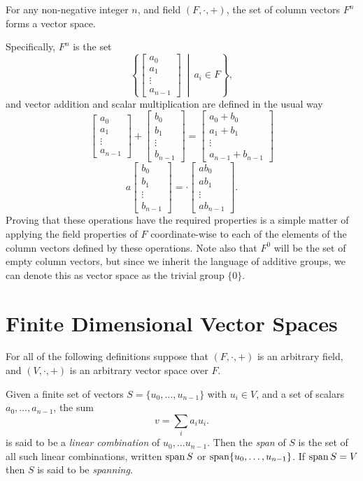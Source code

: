 \begin{prop}
For any non-negative integer $n$, and field $(F, \cdot, +)$, the set of column vectors $F^n$ forms a vector space.
\end{prop}
Specifically, $F^n$ is the set
\[\left\{\begin{bmatrix}a_0\\a_1\\\vdots\\a_{n-1}\end{bmatrix}\ \middle|\ a_i \in F\right\},\]
and vector addition and scalar multiplication are defined in the usual way
\[\begin{bmatrix}
	a_0 \\ a_1 \\ \vdots \\ a_{n-1}
\end{bmatrix} + \begin{bmatrix}
b_0 \\ b_1 \\ \vdots \\ b_{n-1}
\end{bmatrix} = \begin{bmatrix}
a_0 + b_0 \\ a_1 + b_1 \\ \vdots \\ a_{n-1} + b_{n-1}
\end{bmatrix}\]
\[
a\begin{bmatrix}
	b_0 \\ b_1 \\ \vdots \\ b_{n-1}
\end{bmatrix} = \cdot \begin{bmatrix}
	a b_0 \\ a b_1 \\ \vdots \\ a b_{n-1}
\end{bmatrix}.
\]
Proving that these operations have the required properties is a simple matter of applying the field properties of $F$ coordinate-wise to each of the elements of the column vectors defined by these operations. Note also that $F^0$ will be the set of empty column vectors, but since we inherit the language of additive groups, we can denote this as vector space as the trivial group $\{0\}$.

\section{Finite Dimensional Vector Spaces}\label{finite-dim}
For all of the following definitions suppose that $(F, \cdot, +)$ is an arbitrary field, and $(V, \cdot, +)$ is an arbitrary vector space over $F$.
\begin{define}
Given a finite set of vectors $S = \{u_0, \dots, u_{n-1}\}$ with $u_i \in V$, and a set of scalars $a_0, \dots, a_{n-1}$, the sum
\[v = \sum_i a_i u_i.\]
is said to be a \emph{linear combination} of $u_0, \dots u_{n-1}$. Then the \emph{span} of $S$ is the set of all such linear combinations, written $\operatorname{span} S$ or $\operatorname{span} \{u_0, \dots, u_{n-1}\}$. If $\operatorname{span} S = V$ then $S$ is said to be \emph{spanning}.
\end{define}

